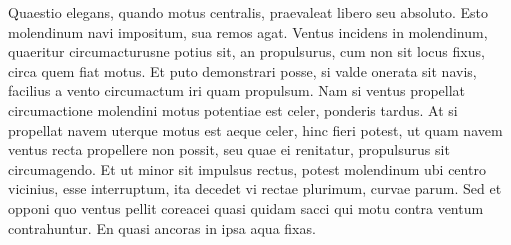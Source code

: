 \pend
\pstart%
Quaestio elegans, quando motus centralis, praevaleat libero seu absoluto.
Esto molendinum\protect{} navi\protect{} impositum,  sua remos\protect{} agat.
Ventus\protect{} incidens in molendinum, quaeritur circumacturusne potius sit, an propulsurus, cum non sit locus fixus, circa quem fiat motus.
Et puto demonstrari posse, si valde onerata sit navis, facilius a vento circumactum iri quam propulsum.
Nam si ventus propellat circumactione\protect{} molendini motus potentiae est celer, ponderis tardus.
At si propellat navem uterque motus est aeque celer, hinc fieri potest, ut quam navem\protect{} ventus recta propellere non possit, seu quae ei renitatur, propulsurus sit circumagendo.
Et ut minor sit impulsus rectus,\protect{} potest molendinum\protect{} ubi centro vicinius, esse interruptum, ita decedet vi rectae plurimum, curvae parum.
Sed et opponi  quo ventus pellit coreacei quasi quidam sacci qui motu contra ventum\protect{} contrahuntur.
En quasi ancoras in ipsa aqua fixas.
\pend
\count{}
\count{}
\count{}